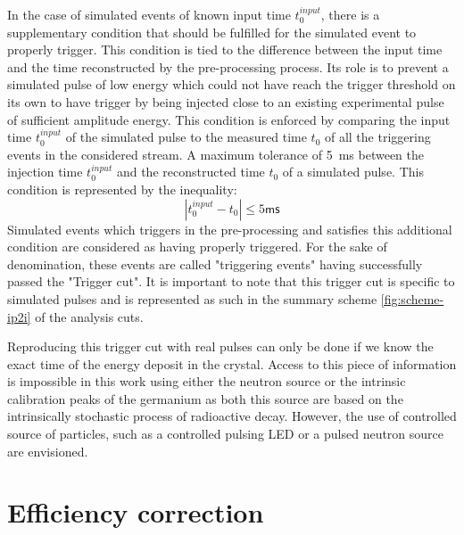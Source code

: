 In the case of simulated events of known input time $t_0^{input}$, there is a supplementary condition that should be fulfilled for the simulated event to properly trigger. This condition is tied to the difference between the input time and the time reconstructed by the pre-processing process. Its role is to prevent a simulated pulse of low energy which could not have reach the trigger threshold on its own to have trigger by being injected close to an existing experimental pulse of sufficient amplitude energy. This condition is enforced by comparing the input time $t_0^{input}$ of the simulated pulse to the measured time $t_0$ of all the triggering events in the considered stream. A maximum tolerance of \SI{5}{\milli\s} between the injection time  $t_0^{input}$ and the reconstructed time $t_0$ of a simulated pulse. This condition is represented by the inequality:
\begin{equation}
| t_0^{input} - t_0 | \leq 5\textsf{ms}
\end{equation}
Simulated events which triggers in the pre-processing and satisfies this additional condition  are considered as having properly triggered. For the sake of denomination, these events are called "triggering events" having successfully passed the "Trigger cut". 
It is important to note that this trigger cut is specific to simulated pulses and is represented as such in the summary scheme \ref{fig:scheme-ip2i} of the analysis cuts. 

Reproducing this trigger cut with real pulses can only be done if we know the exact time of the energy deposit in the crystal. Access to this piece of information is impossible in this work using either the neutron source or the intrinsic calibration peaks of the germanium as both this source are based on the intrinsically stochastic process of radioactive decay. However, the use of controlled source of particles, such as a controlled pulsing LED or a pulsed neutron source are envisioned.



\section{Efficiency correction}
\label{par:efficiency}

